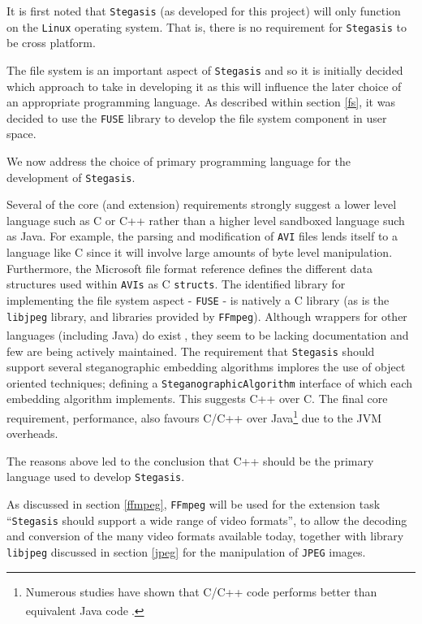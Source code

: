 \documentclass[paper=a4, fontsize=11pt,twoside]{scrartcl}
\numberwithin{table}{section}
\numberwithin{figure}{section}
\numberwithin{algorithm}{section}
\begin{document}
It is first noted that \texttt{Stegasis} (as developed for this project) will only function on the \texttt{Linux} operating system. That is, there is no requirement for \texttt{Stegasis} to be cross platform.  

The file system is an important aspect of \texttt{Stegasis} and so it is initially decided which approach to take in developing it as this will influence the later choice of an appropriate programming language. As described within section \ref{fs}, it was decided to use the \texttt{FUSE} library to develop the file system component in user space.

We now address the choice of primary programming language for the development of \texttt{Stegasis}.

Several of the core (and extension) requirements strongly suggest a lower level language such as C or C++ rather than a higher level sandboxed language such as Java. For example, the parsing and modification of \texttt{AVI} files lends itself to a language like C since it will involve large amounts of byte level manipulation. Furthermore, the Microsoft file format reference defines the different data structures used within \texttt{AVIs} as C \texttt{structs}. The identified library for implementing the file system aspect - \texttt{FUSE} - is natively a C library (as is the \texttt{libjpeg} library, and libraries provided by \texttt{FFmpeg}). Although wrappers for other languages (including Java) do exist\textsuperscript{\cite{javafuse} \cite{turbojpeg}}, they seem to be lacking documentation and few are being actively maintained. The requirement that \texttt{Stegasis} should support several steganographic embedding algorithms implores the use of object oriented techniques; defining a \texttt{SteganographicAlgorithm} interface of which each embedding algorithm implements. This suggests C++ over C. The final core requirement, performance, also favours C/C++ over Java\footnote{Numerous studies have shown that C/C++ code performs better than equivalent Java code\textsuperscript{\cite{javaper1} \cite{javaper2} \cite{javaper3}}.} due to the JVM overheads. 

The reasons above led to the conclusion that C++ should be the primary language used to develop \texttt{Stegasis}.

As discussed in section \ref{ffmpeg}, \texttt{FFmpeg} will be used for the extension task ``\texttt{Stegasis} should support a wide range of video formats'', to allow the decoding and conversion of the many video formats available today, together with library \texttt{libjpeg} discussed in section \ref{jpeg} for the manipulation of \texttt{JPEG} images. 
\end{document}

